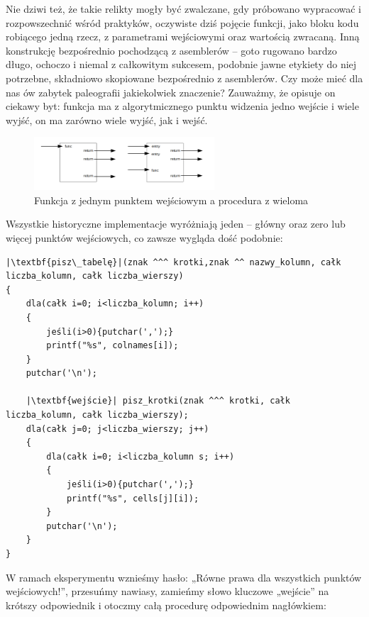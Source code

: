 Nie dziwi też, że takie relikty mogły być zwalczane, gdy próbowano wypracować i rozpowszechnić wśród praktyków, oczywiste dziś pojęcie funkcji, jako bloku kodu robiącego jedną rzecz, z parametrami wejściowymi oraz wartością zwracaną. Inną konstrukcję bezpośrednio pochodzącą z asemblerów – goto rugowano bardzo długo, ochoczo i niemal z całkowitym sukcesem, podobnie jawne etykiety do niej potrzebne, składniowo skopiowane bezpośrednio z asemblerów. Czy może mieć dla nas ów zabytek paleografii jakiekolwiek znaczenie? Zauważmy, że opisuje on ciekawy byt: funkcja ma z algorytmicznego punktu widzenia jedno wejście i wiele wyjść, on ma zarówno wiele wyjść, jak i wejść.
\begin{figure}[h]
    \centering
    \includegraphics[width=0.6\textwidth]{images/wywod/pudelka.png}
    \caption{Funkcja z jednym punktem wejściowym a procedura z wieloma}
\end{figure}

Wszystkie historyczne implementacje wyróżniają jeden – główny oraz zero lub więcej punktów wejściowych, co zawsze wygląda dość podobnie:


\lstset{
    escapechar=|,
    breaklines=true
}
\begin{lstlisting}
|\textbf{pisz\_tabelę}|(znak ^^^ krotki,znak ^^ nazwy_kolumn, całk liczba_kolumn, całk liczba_wierszy)
{
    dla(całk i=0; i<liczba_kolumn; i++)
    {
        jeśli(i>0){putchar(',');}
        printf("%s", colnames[i]);
    }
    putchar('\n');
    
    |\textbf{wejście}| pisz_krotki(znak ^^^ krotki, całk liczba_kolumn, całk liczba_wierszy);
    dla(całk j=0; j<liczba_wierszy; j++)
    {
        dla(całk i=0; i<liczba_kolumn s; i++)
        {
            jeśli(i>0){putchar(',');}
            printf("%s", cells[j][i]);
        }
        putchar('\n');
    }
}
\end{lstlisting}
W ramach eksperymentu wznieśmy hasło: „Równe prawa dla wszystkich punktów wejściowych!”, przesuńmy nawiasy,  zamieńmy słowo kluczowe „wejście” na krótszy odpowiednik i otoczmy całą procedurę odpowiednim nagłówkiem:


